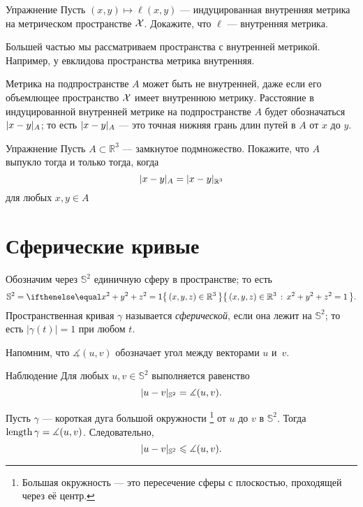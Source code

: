 \begin{thm}{Упражнение}\label{ex:induced-is-length}
Пусть $(x,y)\mapsto \ell(x,y)$ --- индуцированная внутренняя метрика на метрическом пространстве $\mathcal{X}$.
Докажите, что $\ell$ --- внутренняя метрика.
\end{thm}

Большей частью мы рассматриваем пространства с внутренней метрикой.
Например, у евклидова пространства метрика внутренняя.

Метрика на подпространстве $A$ может быть не внутренней, даже если его объемлющее пространство $\mathcal{X}$ имеет внутреннюю метрику.
Расстояние в индуцированной внутренней метрике на подпространстве $A$ будет обозначаться $\dist{x}{y}A$;
то есть $\dist{x}{y}A$ --- это точная нижняя грань длин путей в $A$ от $x$ до $y$.

\begin{thm}{Упражнение}\label{ex:intrinsic-convex}
Пусть $A\subset \mathbb{R}^3$ --- замкнутое подмножество.
Покажите, что $A$ выпукло тогда и только тогда, когда
\[\dist{x}{y}A=\dist{x}{y}{\mathbb{R}^3}\]
для любых $x,y\in A$
\end{thm}



\section{Сферические кривые}

Обозначим через $\mathbb{S}^2$ единичную сферу в пространстве; то есть
\[\mathbb{S}^2=\set{(x,y,z)\in\mathbb{R}^3}{x^2+y^2+z^2=1}.\]
Пространственная кривая $\gamma$ называется \emph{сферической}, если она лежит на $\mathbb{S}^2$;
то есть $|\gamma(t)|=1$ при любом $t$.

Напомним, что $\measuredangle(u,v)$ обозначает угол между векторами $u$ и~$v$.

\begin{thm}{Наблюдение}\label{obs:S2-length}
Для любых $u,v\in \mathbb{S}^2$ выполняется равенство
\[\dist{u}{v}{\mathbb{S}^2}=\measuredangle(u,v).\]

\end{thm}

Пусть $\gamma$ --- короткая дуга большой окружности%
\footnote{Большая окружность --- это пересечение сферы с плоскостью, проходящей через её центр.}
от $u$ до $v$ в $\mathbb{S}^2$.
Тогда $\mathop{\rm length}\nolimits\gamma=\measuredangle(u,v)$.
Следовательно,
\[\dist{u}{v}{\mathbb{S}^2}\le\measuredangle(u,v).\]

